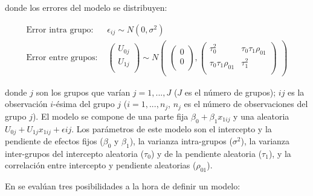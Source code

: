 \documentclass[
  12pt,
  a4paper,
  extrafontsizes,
  onecolumn,
  openright,
  table]{memoir}
\begin{document}
donde los errores del modelo se distribuyen:

\[
\begin{aligned}
\text{Error intra grupo: } &  \epsilon_{ij} \sim N(0, \sigma^2) \\
\text{Error entre grupos: } &
\begin{pmatrix}
     U_{0j} \\
     U_{1j} \\
\end{pmatrix} 
\sim
N
\begin{pmatrix}
\begin{pmatrix}
     0 \\
     0 \\
\end{pmatrix},
\begin{pmatrix}
     \tau_0^2 & \tau_0\tau_1\rho_{01} \\
     \tau_0\tau_1\rho_{01} &  \tau_1^2 \\
\end{pmatrix}
\end{pmatrix} 
\end{aligned}
\]

donde \(j\) son los grupos que varían \(j = 1,...,J\) (\(J\) es el
número de grupos); \(ij\) es la observación \(i\)-ésima del grupo \(j\)
(\(i = 1,...,n_j\), \(n_j\) es el número de observaciones del grupo
\(j\)). El modelo se compone de una parte fija
\(\beta_0 + \beta_1 x_{1ij}\) y una aleatoria
\(U_{0j} + U_{1j} x_{1ij} + \epsilon{ij}\). Los parámetros de este
modelo son el intercepto y la pendiente de efectos fijos (\(\beta_0\) y
\(\beta_1\)), la varianza intra-grupos (\(\sigma^2\)), la varianza
inter-grupos del intercepto aleatoria (\(\tau_0\)) y de la pendiente
aleatoria (\(\tau_1\)), y la correlación entre intercepto y pendiente
aleatorias (\(\rho_{01}\)).

En \textcite[p.~115]{gelman2013} se evalúan tres posibilidades a la hora
de definir un modelo:
\end{document}
